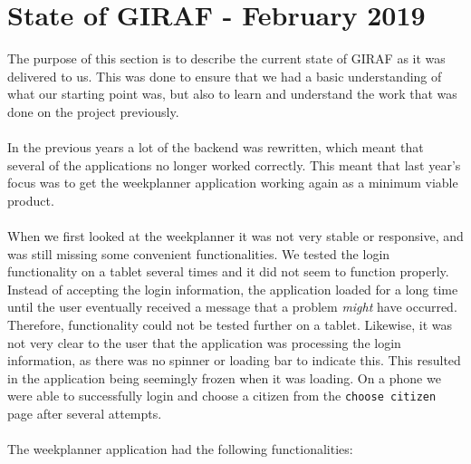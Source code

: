 \section{State of GIRAF - February 2019}\label{sec:stateOfGirafFeb2019}
The purpose of this section is to describe the current state of GIRAF as it was delivered to us.
This was done to ensure that we had a basic understanding of what our starting point was, but also to learn and understand the work that was done on the project previously.
\\\\
In the previous years a lot of the backend was rewritten, which meant that several of the applications no longer worked correctly.
This meant that last year's focus was to get the weekplanner application working again as a minimum viable product.
\\\\
When we first looked at the weekplanner it was not very stable or responsive, and was still missing some convenient functionalities.
We tested the login functionality on a tablet several times and it did not seem to function properly.
Instead of accepting the login information, the application loaded for a long time until the user eventually received a message that a problem \textit{might} have occurred.
Therefore, functionality could not be tested further on a tablet.
Likewise, it was not very clear to the user that the application was processing the login information, as there was no spinner or loading bar to indicate this.
This resulted in the application being seemingly frozen when it was loading.
On a phone we were able to successfully login and choose a citizen from the \texttt{choose citizen} page after several attempts.
\\\\
The weekplanner application had the following functionalities:
